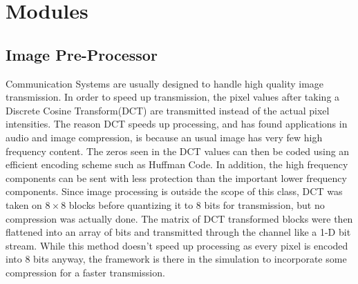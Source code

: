 \section{Modules}
\subsection{Image Pre-Processor}
Communication Systems are usually designed to handle high quality image transmission. In order to speed up transmission, the pixel values after taking a Discrete Cosine Transform(DCT) are transmitted instead of the actual pixel intensities. The reason DCT speeds up processing, and has found applications in audio and image compression, is because an usual image has very few high frequency content. The zeros seen in the DCT values can then be coded using an efficient encoding scheme such as Huffman Code. In addition, the high frequency components can be sent with less protection than the important lower frequency components. Since image processing is outside the scope of this class, DCT was taken on $8 \times 8$ blocks before quantizing it to $8$ bits for transmission, but no compression was actually done. The matrix of DCT transformed blocks were then flattened into an array of bits and transmitted through the channel like a 1-D bit stream. While this method doesn't speed up processing as every pixel is encoded into $8$ bits anyway, the framework is there in the simulation to incorporate some compression for a faster transmission. 

